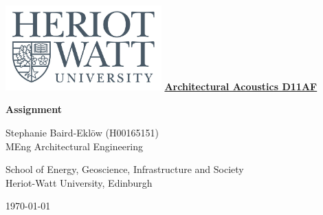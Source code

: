 \documentclass{article}
\numberwithin{equation}{section}
\numberwithin{figure}{section}
\numberwithin{table}{section}
\begin{document}
\begin{titlepage}
    \includegraphics[width=6cm, left]{figures/HWlogo2016.jpg} %
    \centering
    \vfill
    {\bfseries\LARGE
        \textbf{\underline{Architectural Acoustics D11AF}}
    }
    
    {\bfseries\LARGE
        \textbf{Assignment}
    }
  
    
    \vfill
    {\Large
        Stephanie Baird-Ekl\"{o}w (H00165151)\\MEng Architectural Engineering
        
        School of Energy, Geoscience, Infrastructure and Society\\Heriot-Watt University, Edinburgh
        
        \today
    }
\end{titlepage}



  \newpage
  \large\tableofcontents
  
  


      \newpage
      \listoffigures
      \newpage
      \listoftables
      \newpage

  
  \newpage

  
  \newpage
  
  
  \newpage
  
  
  \newpage
  
  
  \newpage
  
  
  \newpage
  
  
  \newpage

  
  \newpage

  
  
\end{document}
